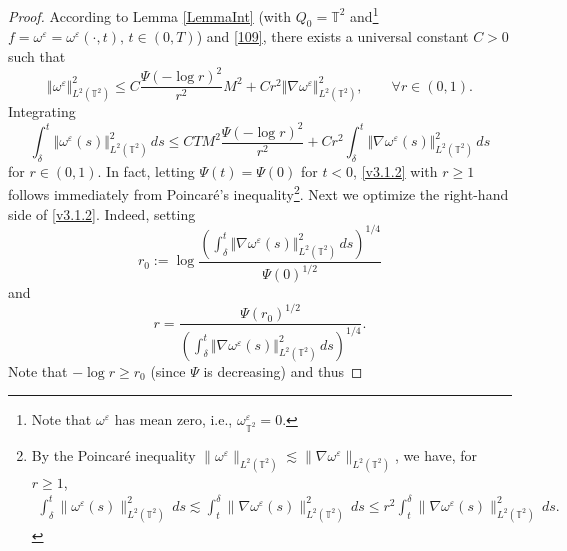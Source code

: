\documentclass[11pt, a4paper,leqno]{amsart}
\theoremstyle{plain}
\numberwithin{equation}{section}
\theoremstyle{definition}
\theoremstyle{remark}
\def\T{\mathbb{T}}
\begin{document}
\begin{proof}
According to Lemma \ref{LemmaInt} (with $Q_{0}=\mathbb{T}^{2}$ and\footnote{Note
that $\omega^\varepsilon$ has mean zero, i.e., $\omega^\varepsilon_{\mathbb{T}^{2}}=0$.}
$f=\omega^{\varepsilon}=\omega^{\varepsilon}(\cdot,t), \, t\in(0,T)$) and \eqref{109}, there exists a universal constant $C > 0$ such that
\[
\Vert\omega^{\varepsilon}\Vert_{L^{2}(\T^2)}^{2}\leq C\frac{\Psi(-\log r)^{2}}{r^{2}}%
M^{2}+Cr^{2}\Vert\nabla\omega^{\varepsilon}\Vert_{L^{2}(\T^2)}^{2}, \qquad \forall r \in (0, 1). 
\]
Integrating
\begin{equation}
\int_{\delta}^{t}\Vert\omega^{\varepsilon}(s)\Vert_{L^{2}(\T^2)}^{2}\,ds %
  \leq CTM^{2}\frac{\Psi(-\log r)^{2}}{r^{2}}+Cr^{2}\int_{\delta}^{t}%
\Vert\nabla\omega^{\varepsilon}(s)\Vert_{L^{2}(\T^2)}^{2}\, ds\label{v3.1.2}%
\end{equation}
for $r \in (0, 1)$. 
 In fact, letting $\Psi(t)=\Psi(0)$ for $t<0$,
\eqref{v3.1.2} with $r\geq1$ follows immediately from Poincar\'{e}'s
inequality\footnote{By the Poincar\'e inequality $\|\omega^\varepsilon\|_{L^2(\T^2)} \lesssim \|\nabla \omega^\varepsilon\|_{L^2(\T^2)}$, we have, for $r \geq 1$, \begin{align*}\int_\delta^t \|\omega^\varepsilon(s)\|^2_{L^2(\T^2)} \, ds \lesssim \int_t^\delta \|\nabla \omega^\varepsilon(s)\|^2_{L^2(\T^2)} \, ds \leq r^2 \int_t^\delta \|\nabla \omega^\varepsilon(s)\|^2_{L^2(\T^2)} \, ds. \end{align*}}. Next we optimize the right-hand side of \eqref{v3.1.2}. Indeed,
setting
\begin{equation*}
r_{0}:=\log\frac{(\int_{\delta}^{t}\Vert\nabla\omega^{\varepsilon}(s)\Vert_{L^{2}(\T^2)}%
^{2}\,ds)^{1/4}}{\Psi(0)^{1/2}}
\end{equation*}
and
\[
r=\frac{\Psi(r_{0})^{1/2}}{(\int_{\delta}^{t}\Vert\nabla\omega^{\varepsilon}%
(s)\Vert_{L^{2}(\T^2)}^{2}\,ds)^{1/4}}.
\]
Note that $-\log r\geq r_{0}$ (since $\Psi$ is decreasing) and thus

\end{proof}
\end{document}
